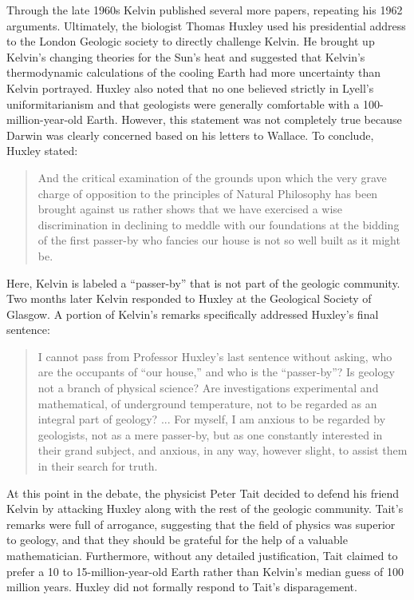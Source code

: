 \documentclass[12pt]{article}
\begin{document}
Through the late 1960s Kelvin published several more papers, repeating his 1962 arguments. Ultimately, the biologist Thomas Huxley used his presidential address to the London Geologic society to directly challenge Kelvin. He brought up Kelvin's changing theories for the Sun's heat and suggested that Kelvin's thermodynamic calculations of the cooling Earth had more uncertainty than Kelvin portrayed. Huxley also noted that no one believed strictly in Lyell's uniformitarianism and that geologists were generally comfortable with a 100-million-year-old Earth. However, this statement was not completely true because Darwin was clearly concerned based on his letters to Wallace. To conclude, Huxley stated: 

\begin{quote}
  And the critical examination of the grounds upon which the very grave charge of opposition to the principles of Natural Philosophy has been brought against us rather shows that we have exercised a wise discrimination in declining to meddle with our foundations at the bidding of the first passer-by who fancies our house is not so well built as it might be.
\end{quote}
Here, Kelvin is labeled a ``passer-by'' that is not part of the geologic community. Two months later Kelvin responded to Huxley at the Geological Society of Glasgow. A portion of Kelvin's remarks specifically addressed Huxley's final sentence:

\begin{quote}
  I cannot pass from Professor Huxley's last sentence without asking, who are the occupants of ``our house,'' and who is the ``passer-by''? Is geology not a branch of physical science? Are investigations experimental and mathematical, of underground temperature, not to be regarded as an integral part of geology? ... For myself, I am anxious to be regarded by geologists, not as a mere passer-by, but as one constantly interested in their grand subject, and anxious, in any way, however slight, to assist them in their search for truth.
\end{quote}

At this point in the debate, the physicist Peter Tait decided to defend his friend Kelvin by attacking Huxley along with the rest of the geologic community. Tait's remarks were full of arrogance, suggesting that the field of physics was superior to geology, and that they should be grateful for the help of a valuable mathematician. Furthermore, without any detailed justification, Tait claimed to prefer a 10 to 15-million-year-old Earth rather than Kelvin's median guess of 100 million years. Huxley did not formally respond to Tait's disparagement.
\end{document}
